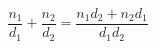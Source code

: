 \documentclass[12pt]{article}
\begin{document}
\sicpsize
\[
\frac{n_1}{d_1} + \frac{n_2}{d_2} = \frac{n_1d_2 + n_2d_1}{d_1d_2}
\]
\end{document}

